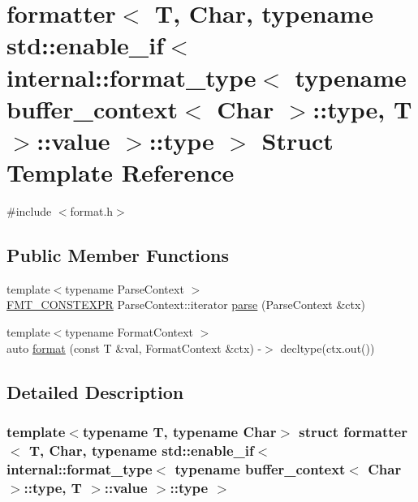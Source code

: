 \hypertarget{structformatter_3_01_t_00_01_char_00_01typename_01std_1_1enable__if_3_01internal_1_1format__typeef2b7d59b5441fbead72290e06693dea}{}\section{formatter$<$ T, Char, typename std\+:\+:enable\+\_\+if$<$ internal\+:\+:format\+\_\+type$<$ typename buffer\+\_\+context$<$ Char $>$\+:\+:type, T $>$\+:\+:value $>$\+:\+:type $>$ Struct Template Reference}
\label{structformatter_3_01_t_00_01_char_00_01typename_01std_1_1enable__if_3_01internal_1_1format__typeef2b7d59b5441fbead72290e06693dea}


{\ttfamily \#include $<$format.\+h$>$}

\subsection*{Public Member Functions}
\begin{DoxyCompactItemize}
\item 
{\footnotesize template$<$typename Parse\+Context $>$ }\\\hyperlink{core_8h_a69201cb276383873487bf68b4ef8b4cd}{F\+M\+T\+\_\+\+C\+O\+N\+S\+T\+E\+X\+PR} Parse\+Context\+::iterator \hyperlink{structformatter_3_01_t_00_01_char_00_01typename_01std_1_1enable__if_3_01internal_1_1format__typeef2b7d59b5441fbead72290e06693dea_ae66fc4d23664a9533b055208fa9692bf}{parse} (Parse\+Context \&ctx)
\item 
{\footnotesize template$<$typename Format\+Context $>$ }\\auto \hyperlink{structformatter_3_01_t_00_01_char_00_01typename_01std_1_1enable__if_3_01internal_1_1format__typeef2b7d59b5441fbead72290e06693dea_a8274845c3589a2e3de1ce4cd19739788}{format} (const T \&val, Format\+Context \&ctx) -\/$>$ decltype(ctx.\+out())
\end{DoxyCompactItemize}


\subsection{Detailed Description}
\subsubsection*{template$<$typename T, typename Char$>$\newline
struct formatter$<$ T, Char, typename std\+::enable\+\_\+if$<$ internal\+::format\+\_\+type$<$ typename buffer\+\_\+context$<$ Char $>$\+::type, T $>$\+::value $>$\+::type $>$}



